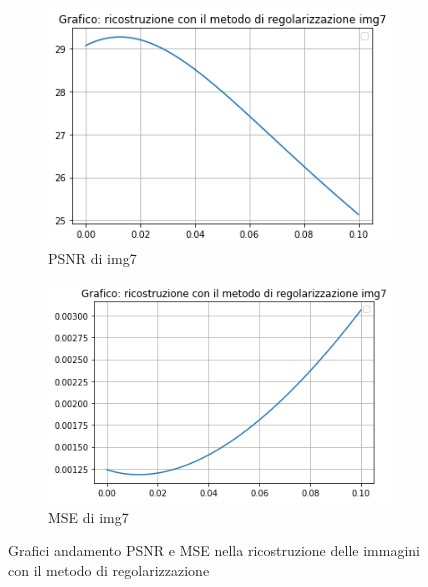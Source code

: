 \begin{figure}[H]
    \begin{subfigure}{0.5\textwidth}
        \centering
        \includegraphics[width=\textwidth]{output/PSNR/outputPSNR-img7.png}
        \caption{PSNR di img7}
        \label{fig:img7PSNR}
    \end{subfigure}\hfill
    \begin{subfigure}{0.5\textwidth}
        \centering
        \includegraphics[width=\textwidth]{output/MSE/outputMSE-img7.png}
        \caption{MSE di img7}
        \label{fig:img7MSE}
    \end{subfigure}
    \caption{Grafici andamento PSNR e MSE nella ricostruzione delle immagini con il metodo di regolarizzazione}
\end{figure}%
